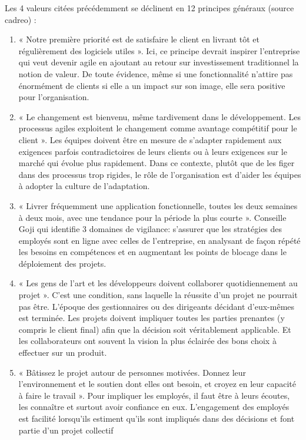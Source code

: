 \documentclass[12pt,a4paper]{article}
\begin{document}
Les 4 valeurs citées précédemment se déclinent en 12 principes généraux (source cadreo) :
\begin{enumerate}
\item	« Notre première priorité est de satisfaire le client en livrant tôt et régulièrement des logiciels utiles ». Ici, ce principe devrait inspirer l'entreprise qui veut devenir agile en ajoutant au retour sur investissement traditionnel la notion de valeur. De toute évidence, même si une fonctionnalité n'attire pas énormément de clients si elle a un impact sur son image, elle sera positive pour l'organisation.

\item	« Le changement est bienvenu, même tardivement dans le développement. Les processus agiles exploitent le changement comme avantage compétitif pour le client ». Les équipes doivent être en mesure de s'adapter rapidement aux exigences parfois contradictoires de leurs clients ou à leurs exigences sur le marché qui évolue plus rapidement. Dans ce contexte, plutôt que de les figer dans des processus trop rigides, le rôle de l’organisation est d’aider les équipes à adopter la culture de l’adaptation.

\item	« Livrer fréquemment une application fonctionnelle, toutes les deux semaines à deux mois, avec une tendance pour la période la plus courte ». Conseille Goji qui identifie 3 domaines de vigilance: s'assurer que les stratégies des employés sont en ligne avec celles de l'entreprise, en analysant de façon répété les besoins en compétences et en augmentant les points de blocage dans le déploiement des projets.

\item	« Les gens de l'art et les développeurs doivent collaborer quotidiennement au projet ». C'est une condition, sans laquelle la réussite d'un projet ne pourrait pas être. L'époque des gestionnaires ou des dirigeants décidant d'eux-mêmes est terminée. Les projets doivent impliquer toutes les parties prenantes (y compris le client final) afin que la décision soit véritablement applicable. Et les collaborateurs ont souvent la vision la plus éclairée des bons choix à effectuer sur un produit.

\item	« Bâtissez le projet autour de personnes motivées. Donnez leur l'environnement et le soutien dont elles ont besoin, et croyez en leur capacité à faire le travail ». Pour impliquer les employés, il faut être à leurs écoutes, les connaître et surtout avoir confiance en eux. L'engagement des employés est facilité lorsqu'ils estiment qu'ils sont impliqués dans des décisions et font partie d'un projet collectif


\end{enumerate}
\end{document}
